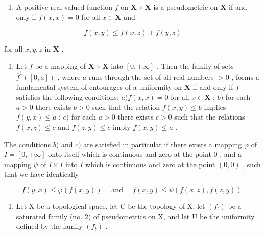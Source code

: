 \ExerciseSection

\begin{enumerate}
\def\labelenumi{\arabic{enumi})}
\tightlist
\item
  A positive real-valued function \(f\) on \(\mathbf{X} \times \mathbf{X}\) is a pseudometric on \(\mathbf{X}\) if and only if \(f(x, x) = 0\) for all \(x \in \mathbf{X}\) and
\end{enumerate}

\[
f (x, y) \leqslant f (x, z) + f (y, z)
\]

for all \(x, y, z\) in \(\mathbf{X}\) .

\begin{enumerate}
\def\labelenumi{\arabic{enumi})}
\setcounter{enumi}{1}
\tightlist
\item
  Let \(f\) be a mapping of \(\mathbf{X} \times \mathbf{X}\) into \([0, +\infty]\) . Then the family of sets \(\overline{f}^{1}([0, a])\) , where \(a\) runs through the set of all real numbers \(>0\) , forms a fundamental system of entourages of a uniformity on \(\mathbf{X}\) if and only if \(f\) satisfies the following conditions: \(a) f(x, x) = 0\) for all \(x \in \mathbf{X}\) ; \(b)\) for each \(a > 0\) there exists \(b > 0\) such that the relation \(f(x, y) \leqslant b\) implies \(f(y, x) \leqslant a\) ; \(c)\) for each \(a > 0\) there exists \(c > 0\) such that the relations \(f(x, z) \leqslant c\) and \(f(z, y) \leqslant c\) imply \(f(x, y) \leqslant a\) .
\end{enumerate}

The conditions \(b)\) and \(c)\) are satisfied in particular if there exists a mapping \(\varphi\) of \(I = [0, +\infty]\) onto itself which is continuous and zero at the point \(0\) , and a mapping \(\psi\) of \(I \times I\) into \(I\) which is continuous and zero at the point \((0, 0)\) , such that we have identically

\[
f (y, x) \leqslant \varphi (f (x, y)) \quad \text { and } \quad f (x, y) \leqslant \psi (f (x, z), f (z, y)).
\]

\begin{enumerate}
\def\labelenumi{\arabic{enumi})}
\setcounter{enumi}{2}
\tightlist
\item
  Let X be a topological space, let C be the topology of X, let \((f_{t})\) be a saturated family (no. 2) of pseudometrics on X, and let U be the uniformity defined by the family \((f_{t})\) .
\end{enumerate}

